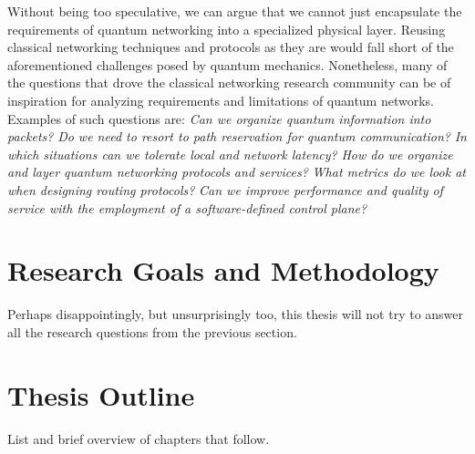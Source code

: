 \begin{refsection}
Without being too speculative, we can argue that we cannot just encapsulate the requirements of
quantum networking into a specialized physical layer. Reusing classical networking techniques and
protocols as they are would fall short of the aforementioned challenges posed by quantum mechanics.
Nonetheless, many of the questions that drove the classical networking research community can be of
inspiration for analyzing requirements and limitations of quantum networks. Examples of such
questions are: \emph{Can we organize quantum information into packets?} \emph{Do we need to resort
to path reservation for quantum communication?} \emph{In which situations can we tolerate local and
network latency?} \emph{How do we organize and layer quantum networking protocols and services?}
\emph{What metrics do we look at when designing routing protocols?} \emph{Can we improve performance
and quality of service with the employment of a software-defined control plane?}

\section{Research Goals and Methodology}


Perhaps disappointingly, but unsurprisingly too, this thesis will not try to answer all the research
questions from the previous section.

\section{Thesis Outline}

List and brief overview of chapters that follow.

\printbibliography[heading=subbibintoc,title={References}]

\end{refsection}
